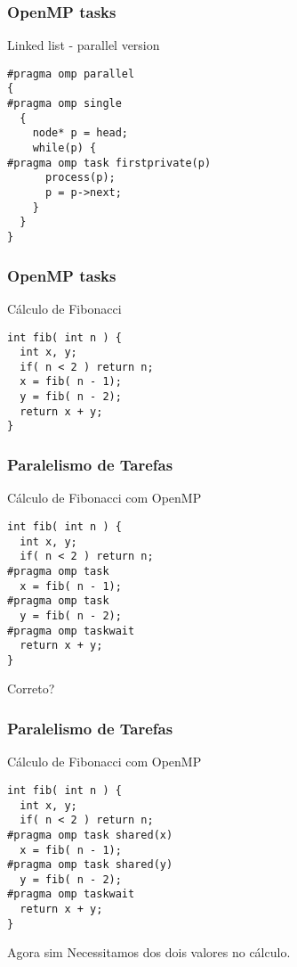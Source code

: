 \begin{frame}[fragile]
  \frametitle{OpenMP tasks}
\begin{block}{Linked list - parallel version}
\begin{lstlisting}
#pragma omp parallel
{
#pragma omp single 
  {
    node* p = head;
    while(p) {
#pragma omp task firstprivate(p)
      process(p);
      p = p->next;
    }
  }
}
\end{lstlisting}
\end{block}
%
\end{frame}
\begin{frame}[fragile]
  \frametitle{OpenMP tasks}
\begin{block}{Cálculo de Fibonacci}
\begin{lstlisting}
int fib( int n ) {
  int x, y;
  if( n < 2 ) return n;
  x = fib( n - 1);
  y = fib( n - 2);
  return x + y;
}
\end{lstlisting}
\end{block}
%
\end{frame}
\begin{frame}[fragile]
  \frametitle{Paralelismo de Tarefas}
\begin{block}{Cálculo de Fibonacci com OpenMP}
\begin{lstlisting}
int fib( int n ) {
  int x, y;
  if( n < 2 ) return n;
#pragma omp task
  x = fib( n - 1);
#pragma omp task
  y = fib( n - 2);
#pragma omp taskwait
  return x + y;
}
\end{lstlisting}
\end{block}
%
%
\begin{alertblock}{Correto?}
\end{alertblock}
%
\end{frame}
\begin{frame}[fragile]
  \frametitle{Paralelismo de Tarefas}
\begin{block}{Cálculo de Fibonacci com OpenMP}
\begin{lstlisting}
int fib( int n ) {
  int x, y;
  if( n < 2 ) return n;
#pragma omp task shared(x)
  x = fib( n - 1);
#pragma omp task shared(y)
  y = fib( n - 2);
#pragma omp taskwait
  return x + y;
}
\end{lstlisting}
\end{block}
%
\begin{exampleblock}{Agora sim}
Necessitamos dos dois valores no cálculo.
\end{exampleblock}
%
\end{frame}
